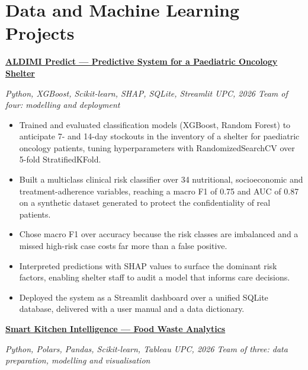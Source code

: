 \documentclass[10pt,letterpaper]{article}
\newcommand{\entry}[2]{%
    \vspace{0.55ex}
    \textbf{#1}\par
    {\small\itshape\color{muted}#2}\par
    \vspace{0.15ex}
}
\newenvironment{points}
{
    \begin{itemize}[
        leftmargin=1.25em,
        itemsep=0.18ex,
        parsep=0pt,
        topsep=0.25ex,
        label=\textbullet
    ]
}
{
    \end{itemize}
}
\begin{document}
\section{Data and Machine Learning Projects}

\entry
{\href{https://portfolio-ztanq.vercel.app/projects/aldimi-predict}
{ALDIMI Predict --- Predictive System for a Paediatric Oncology Shelter}}
{Python, XGBoost, Scikit-learn, SHAP, SQLite, Streamlit
\textbar{} UPC, 2026
\textbar{} Team of four: modelling and deployment}

\begin{points}
    \item Trained and evaluated classification models (XGBoost, Random Forest)
    to anticipate 7- and 14-day stockouts in the inventory of a shelter for
    paediatric oncology patients, tuning hyperparameters with RandomizedSearchCV
    over 5-fold StratifiedKFold.

    \item Built a multiclass clinical risk classifier over 34 nutritional,
    socioeconomic and treatment-adherence variables, reaching a macro F1 of
    0.75 and AUC of 0.87 on a synthetic dataset generated to protect the
    confidentiality of real patients.

    \item Chose macro F1 over accuracy because the risk classes are imbalanced
    and a missed high-risk case costs far more than a false positive.

    \item Interpreted predictions with SHAP values to surface the dominant risk
    factors, enabling shelter staff to audit a model that informs care decisions.

    \item Deployed the system as a Streamlit dashboard over a unified SQLite
    database, delivered with a user manual and a data dictionary.
\end{points}


\entry
{\href{https://portfolio-ztanq.vercel.app/projects/smart-kitchen-intelligence}
{Smart Kitchen Intelligence --- Food Waste Analytics}}
{Python, Polars, Pandas, Scikit-learn, Tableau
\textbar{} UPC, 2026
\textbar{} Team of three: data preparation, modelling and visualisation}
\end{document}
